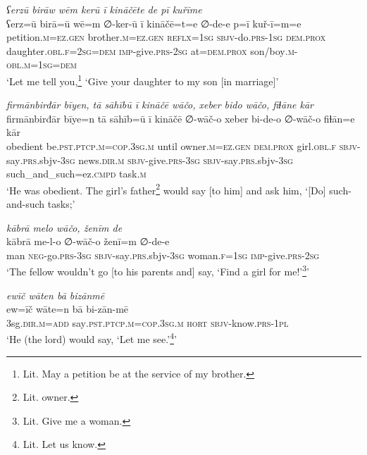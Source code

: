 \ea \label{RE.7}
\textit{ʕerzū birāw wēm kerū ī kināčēte de pī kuřīme} \\ 
\gll ʕerz=ū birā=ū wē=m ∅-ker-ū ī kināčē=t=e ∅-de-e p=ī kuř-ī=m=e \\ 
 petition\textsc{.m}\textsc{\textsc{=ez.gen}} brother\textsc{.m}\textsc{\textsc{=ez.gen}} \textsc{reflx}\textsc{=\textsc{1sg}} \textsc{sbjv-}do\textsc{.prs}\textsc{-\textsc{1sg}} \textsc{dem.prox} daughter\textsc{.obl}\textsc{.f}\textsc{=\textsc{2sg}}\textsc{=dem} \textsc{imp-}give\textsc{.prs}-\textsc{2sg} at=\textsc{dem.prox} son/boy\textsc{.m}\textsc{-obl}\textsc{.m}\textsc{=\textsc{1sg}}\textsc{=dem} \\ 
\glt `Let me tell you,\footnote{Lit. May a petition be at the service of my brother.} ‘Give your daughter to my son [in marriage]'
\z 
 
\ea \label{RE.18}
\textit{firmānbirđār bīyen, tā sāhībū ī kināčē wāčo, xeber bido wāčo, fiɫāne kār} \\ 
\gll firmānbirđār bīye=n tā sāhīb=ū ī kināčē ∅-wāč-o xeber bi-de-o ∅-wāč-o fiɫān=e kār \\ 
 obedient be\textsc{.pst}\textsc{.ptcp}\textsc{.m}\textsc{=cop}\textsc{.3sg}\textsc{.m} until owner\textsc{.m}\textsc{=ez.gen} \textsc{dem.prox} girl\textsc{.obl}\textsc{.f} \textsc{sbjv-}say\textsc{.prs}.sbjv\textsc{-3sg} news\textsc{.dir}\textsc{.m} \textsc{sbjv-}give\textsc{.prs}\textsc{-3sg} \textsc{sbjv-}say\textsc{.prs}.sbjv\textsc{-3sg} such\_and\_such=ez\textsc{.cmpd} task\textsc{.m} \\ 
\glt `He was obedient. The girl’s father\footnote{Lit. owner.} would say [to him] and ask him, ‘[Do] such-and-such tasks;'
\z 
 
\ea \label{RE.29}
\textit{kābrā melo wāčo, ženīm de} \\ 
\gll kābrā me-l-o ∅-wāč-o ženī=m ∅-de-e \\ 
 man \textsc{neg-}go\textsc{.prs}\textsc{-3sg} \textsc{sbjv-}say\textsc{.prs}.sbjv\textsc{-3sg} woman\textsc{.f}\textsc{=\textsc{1sg}} \textsc{imp-}give\textsc{.prs}-\textsc{2sg} \\ 
\glt `The fellow wouldn’t go [to his parents and] say, ‘Find a girl for me!’\footnote{Lit. Give me a woman.}'
\z 
 
\ea \label{RE.51}
\textit{ewīč wāten bā bizānmē} \\ 
\gll ew=īč wāte=n bā bi-zān-mē \\ 
 3sg\textsc{.dir}\textsc{.m}\textsc{=add} say\textsc{.pst}\textsc{.ptcp}\textsc{.m}\textsc{=cop}\textsc{.3sg}\textsc{.m} \textsc{hort} \textsc{sbjv-}know\textsc{.prs}\textsc{-\textsc{1pl}} \\ 
\glt `He (the lord) would say, ‘Let me see.’\footnote{Lit. Let us know.}'
\z 
 

